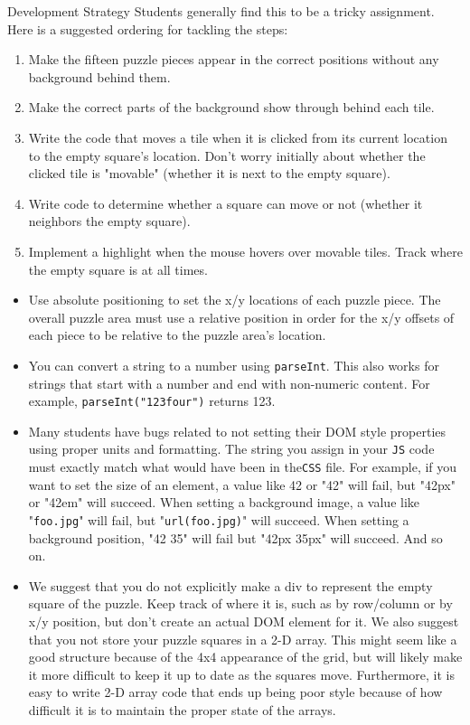 \documentclass[programming]{../../../../mfcs}
\begin{document}
\begin{question}{Development Strategy}
Students generally find this to be a tricky assignment. Here is a suggested ordering for tackling the steps:
\begin{enumerate}[{1.}]
\item Make the fifteen puzzle pieces appear in the correct positions without any background behind them.
\item Make the correct parts of the background show through behind each tile.
\item Write the code that moves a tile when it is clicked from its current location to the empty square's location.
Don't worry initially about whether the clicked tile is "movable" (whether it is next to the empty square).
\item Write code to determine whether a square can move or not (whether it neighbors the empty square).
\item Implement a highlight when the mouse hovers over movable tiles. Track where the empty square is at all times.
\end{enumerate}

\begin{itemize}
\item Use absolute positioning to set the x/y locations of each puzzle piece. The overall puzzle area must use a
relative position in order for the x/y offsets of each piece to be relative to the puzzle area's location.

\item You can convert a string to a number using \texttt{parseInt}. This also works for strings that start with a number and
end with non-numeric content. For example, \texttt{parseInt("123four")} returns 123.

\item Many students have bugs related to not setting their DOM style properties using proper units and formatting. The string you assign in your \texttt{JS} code must exactly match what would have been in the\texttt{CSS} file. For example, if
you want to set the size of an element, a value like 42 or "42" will fail, but "42px" or "42em" will succeed.
When setting a background image, a value like "\texttt{foo.jpg}" will fail, but
"\texttt{url(foo.jpg)}" will succeed. When
setting a background position, "42 35" will fail but "42px 35px" will succeed. And so on.

\item We suggest that you do not explicitly make a div to represent the empty square of the puzzle. Keep track of
where it is, such as by row/column or by x/y position, but don't create an actual DOM element for it. We also
suggest that you not store your puzzle squares in a 2-D array. This might seem like a good structure because of
the 4x4 appearance of the grid, but will likely make it more difficult to keep it up to date as the squares move.
Furthermore, it is easy to write 2-D array code that ends up being poor style because of how difficult it
is to maintain the proper state of the arrays.


\end{itemize}
\end{question}
\end{document}
